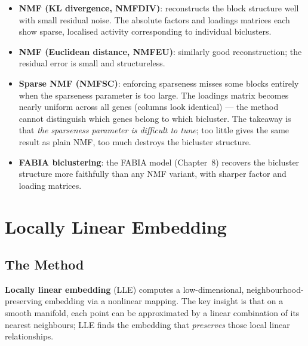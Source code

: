 \documentclass[11pt, oneside]{book}
\begin{document}
\begin{itemize}
  \item \textbf{NMF (KL divergence, NMFDIV)}: reconstructs the block structure
        well with small residual noise.
        The absolute factors and loadings matrices each show sparse, localised
        activity corresponding to individual biclusters.
  \item \textbf{NMF (Euclidean distance, NMFEU)}: similarly good reconstruction;
        the residual error is small and structureless.
  \item \textbf{Sparse NMF (NMFSC)}: enforcing sparseness misses some blocks
        entirely when the sparseness parameter is too large.
        The loadings matrix becomes nearly uniform across all genes (columns look
        identical) — the method cannot distinguish which genes belong to which
        bicluster.
        The takeaway is that \emph{the sparseness parameter is difficult to tune};
        too little gives the same result as plain NMF, too much destroys the
        bicluster structure.
  \item \textbf{FABIA biclustering}: the FABIA model (Chapter~8) recovers the
        bicluster structure more faithfully than any NMF variant, with sharper
        factor and loading matrices.
\end{itemize}

\section{Locally Linear Embedding}

\subsection{The Method}

\textbf{Locally linear embedding} (LLE) computes a low-dimensional,
neighbourhood-preserving embedding via a nonlinear mapping.
The key insight is that on a smooth manifold, each point can be approximated
by a linear combination of its nearest neighbours; LLE finds the embedding
that \emph{preserves} those local linear relationships.
\end{document}

